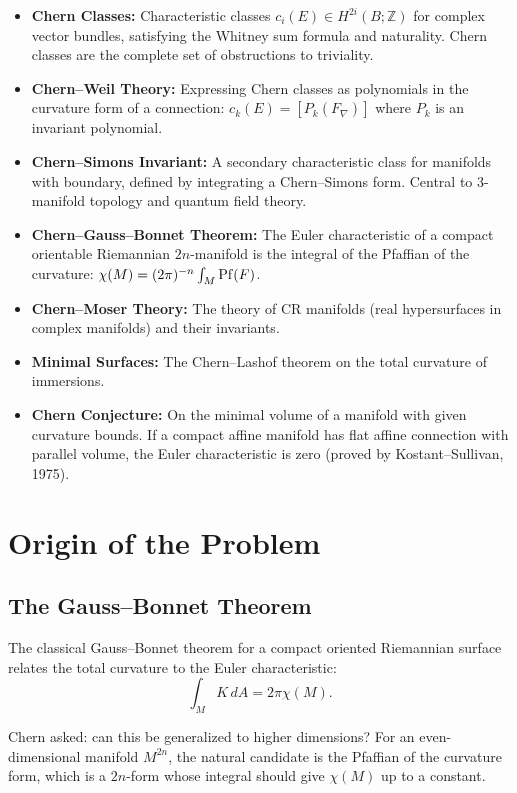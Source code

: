 \begin{itemize}
    \item \textbf{Chern Classes:} Characteristic classes $c_i(E) \in H^{2i}(B; \mathbb{Z})$ for complex vector bundles, satisfying the Whitney sum formula and naturality. Chern classes are the complete set of obstructions to triviality.
    \item \textbf{Chern--Weil Theory:} Expressing Chern classes as polynomials in the curvature form of a connection: $c_k(E) = [P_k(F_\nabla)]$ where $P_k$ is an invariant polynomial.
    \item \textbf{Chern--Simons Invariant:} A secondary characteristic class for manifolds with boundary, defined by integrating a Chern--Simons form. Central to 3-manifold topology and quantum field theory.
    \item \textbf{Chern--Gauss--Bonnet Theorem:} The Euler characteristic of a compact orientable Riemannian $2n$-manifold is the integral of the Pfaffian of the curvature: $\chi(M) = (2\pi)^{-n} \int_M \operatorname{Pf}(F)$.
    \item \textbf{Chern--Moser Theory:} The theory of CR manifolds (real hypersurfaces in complex manifolds) and their invariants.
    \item \textbf{Minimal Surfaces:} The Chern--Lashof theorem on the total curvature of immersions.
    \item \textbf{Chern Conjecture:} On the minimal volume of a manifold with given curvature bounds. If a compact affine manifold has flat affine connection with parallel volume, the Euler characteristic is zero (proved by Kostant--Sullivan, 1975).
\end{itemize}

\section{Origin of the Problem}

\subsection{The Gauss--Bonnet Theorem}

The classical Gauss--Bonnet theorem for a compact oriented Riemannian surface relates the total curvature to the Euler characteristic:
\[
\int_M K \, dA = 2\pi \chi(M).
\]

Chern asked: can this be generalized to higher dimensions? For an even-dimensional manifold $M^{2n}$, the natural candidate is the Pfaffian of the curvature form, which is a $2n$-form whose integral should give $\chi(M)$ up to a constant.

